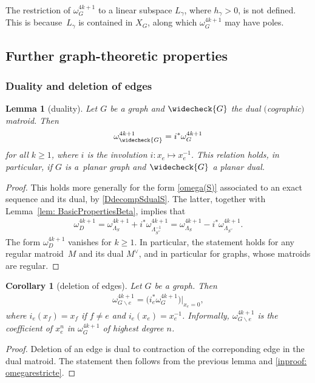 \documentclass[pdftex]{sigma}%
\newtheorem{cor}[thm]{Corollary}
\newtheorem{lem}[thm]{Lemma}
\numberwithin{equation}{section}
\newcommand{\0}{\color{blue}{\mathsf{0}}}
\begin{document}
The restriction of $\omega^{4k+1}_{G}$ to a linear subspace $L_{\gamma}$, where $h_{\gamma}>0$, is not defined. This is because~$L_{\gamma}$ is contained in $X_G$, along which $\omega^{4k+1}_{G}$ may have poles.
 \subsection{Further graph-theoretic properties}

\subsubsection{Duality and deletion of edges }

 \begin{lem}[duality] \label{lem: dual}
 Let $G$ be a graph and $\widecheck{G}$ the dual $($cographic$)$ matroid. Then
 \begin{gather*}
 \omega^{4k+1}_{\widecheck{G}} = i^* \omega^{4k+1}_{G}
 \end{gather*}
 for all $k \geq 1$,
 where $i$ is the involution $i\colon x_e \mapsto x_e^{-1} $. This relation holds, in particular, if $G$ is a~planar graph and $\widecheck{G}$ a planar dual.
 \end{lem}

 \begin{proof} This holds more generally for the form \eqref{omega(S)} associated to an exact sequence and its dual, by \eqref{DdecompSdualS}. The latter, together with Lemma~\ref{lem: BasicPropertiesBeta}, implies that
 \begin{gather*}
 \omega^{4k+1}_D = \omega^{4k+1}_{\Lambda_S} + i^* \omega^{4k+1}_{\Lambda^{-1}_{S^{\vee}}} = \omega^{4k+1}_{\Lambda_S} - i^* \omega^{4k+1}_{\Lambda_{S^{\vee}}}.\end{gather*}
 The form $ \omega^{4k+1}_D$ vanishes for $k\geq 1$.
 In particular, the statement holds for any regular matroid~$M$ and its dual $M^{\vee}$, and in particular for graphs, whose matroids are regular.
 \end{proof}

 \begin{cor}[deletion of edges]
 Let $G$ be a graph. Then
 \begin{gather*}
 \omega^{4k+1}_{G\backslash e} = \big( i_e^* \omega^{4k+1}_{G}\big)\big|_{x_e=0},
 \end{gather*}
 where $i_e (x_f) = x_f$ if $f\neq e$ and $i_e(x_e)= x_e^{-1}$. Informally, $\omega^{4k+1}_{G\backslash e}$ is the coefficient of $x_e^n $ in
 $\omega^{4k+1}_G$ of highest degree $n$.
 \end{cor}
 \begin{proof} Deletion of an edge is dual to contraction of the correponding edge in the dual matroid. The statement then follows from the previous lemma and
\eqref{inproof: omegarestricte}.
 \end{proof}
\end{document}
